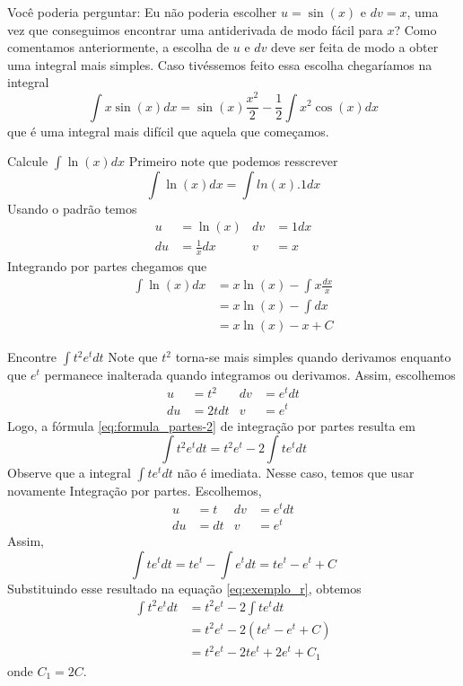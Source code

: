 Você poderia perguntar: Eu não poderia escolher $u= \sin(x)$ e $dv=x $, uma vez
que conseguimos encontrar uma antiderivada de modo fácil para $x$? Como
comentamos anteriormente, a escolha de $u$ e $dv$ deve ser feita de modo a
obter uma integral mais simples. Caso tivéssemos feito essa escolha chegaríamos
na  integral
\[
    \int x \sin(x) dx= \sin(x) \frac{x^2}{2}- \frac{1}{2} \int x^2\cos(x)dx
\]
que é uma integral mais difícil que aquela que começamos.

\begin{example}
  Calcule \(\int \ln(x) dx\)
  \solution
  Primeiro note que podemos resscrever
  \[
    \int \ln(x) dx= \int ln(x). 1 dx
  \]
  Usando o padrão temos
  \begin{align*}
    u  & = \ln(x)        & dv & = 1 dx \\
    du & = \frac{1}{x}dx & v  & = x
  \end{align*}
  Integrando por partes chegamos que
  \begin{align*}
    \int \ln(x) dx
    & = x \ln(x)- \int  x \frac{dx}{x} \\
    & = x \ln(x)-\int dx \\
    & = x \ln(x)-x +C
  \end{align*}
\end{example}

\begin{example}
  Encontre \(\int t^2 e^t dt\)
  \solution
  Note que $t^2$ torna-se mais simples quando derivamos enquanto que
  $e^t$ permanece inalterada quando integramos ou derivamos.
  Assim, escolhemos
  \begin{align*}
    u  & = t^2  & dv & = e^t dt \\
    du & = 2tdt & v  & = e^t
  \end{align*}
  Logo, a fórmula \eqref{eq:formula_partes-2} de integração por partes
  resulta em
  \begin{equation}
    \label{eq:exemplo_r}
    \int t^2 e^t dt= t^2 e^t-2 \int te^t dt
  \end{equation}
  Observe que a integral $ \int te^t dt $ não é imediata.
  Nesse caso, temos que usar novamente Integração por partes.
  Escolhemos,
  \begin{align*}
    u  &= t  & dv & = e^t dt \\
    du &= dt & v  & = e^t
  \end{align*}
  Assim,
  \[
    \int te^t dt
    = t e^t - \int e^t dt
    = t e^t - e^t + C
  \]
  Substituindo esse resultado na equação \ref{eq:exemplo_r}, obtemos
  \begin{align*}
    \int t^2 e^t dt
    & = t^2 e^t - 2\int te^tdt  \\
    & = t^2 e^t - 2(te^t-e^t+C) \\
    & = t^2 e^t - 2te^t+2e^t+C_1
  \end{align*}
  onde $C_1=2C$.
\end{example}

